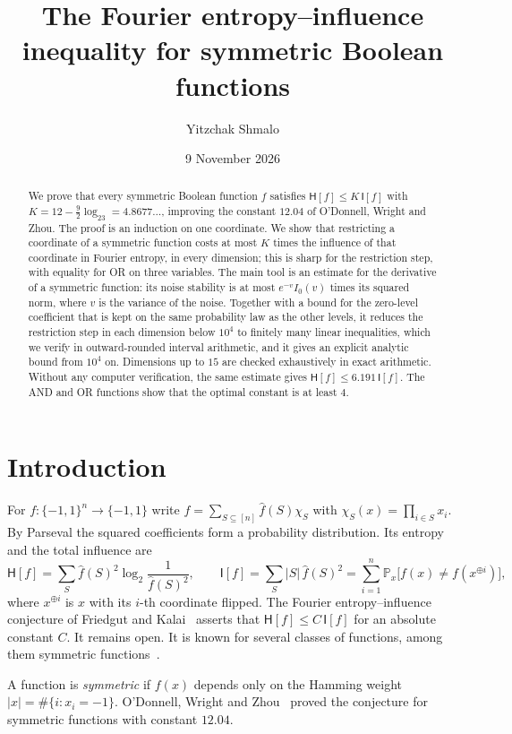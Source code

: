 \documentclass[11pt]{amsart}
\title[Fourier entropy of symmetric functions]{The Fourier entropy--influence inequality for symmetric Boolean functions}
\author{Yitzchak Shmalo}
\date{9 November 2026}
\theoremstyle{definition}
\theoremstyle{remark}
\newcommand{\bits}{\{-1,1\}}
\renewcommand{\P}{\mathbb P}
\newcommand{\HH}{\mathsf H}
\newcommand{\I}{\mathsf I}
\newcommand{\wh}[1]{\widehat{#1}}
\begin{document}
\begin{abstract}
We prove that every symmetric Boolean function $f$ satisfies $\HH[f]\le K\,\I[f]$ with $K=12-\frac92\log_23=4.8677\ldots$, improving the constant $12.04$ of O'Donnell, Wright and Zhou. The proof is an induction on one coordinate. We show that restricting a coordinate of a symmetric function costs at most $K$ times the influence of that coordinate in Fourier entropy, in every dimension; this is sharp for the restriction step, with equality for OR on three variables. The main tool is an estimate for the derivative of a symmetric function: its noise stability is at most $e^{-v}I_0(v)$ times its squared norm, where $v$ is the variance of the noise. Together with a bound for the zero-level coefficient that is kept on the same probability law as the other levels, it reduces the restriction step in each dimension below $10^4$ to finitely many linear inequalities, which we verify in outward-rounded interval arithmetic, and it gives an explicit analytic bound from $10^4$ on. Dimensions up to $15$ are checked exhaustively in exact arithmetic. Without any computer verification, the same estimate gives $\HH[f]\le6.191\,\I[f]$. The AND and OR functions show that the optimal constant is at least $4$.
\end{abstract}
\maketitle

\section{Introduction}

For $f:\bits^n\to\bits$ write $f=\sum_{S\subseteq[n]}\wh f(S)\chi_S$ with $\chi_S(x)=\prod_{i\in S}x_i$. By Parseval the squared coefficients form a probability distribution. Its entropy and the total influence are
\[
 \HH[f]=\sum_{S}\wh f(S)^2\log_2\frac{1}{\wh f(S)^2},\qquad
 \I[f]=\sum_S|S|\,\wh f(S)^2=\sum_{i=1}^n\P_x\bigl[f(x)\ne f(x^{\oplus i})\bigr],
\]
where $x^{\oplus i}$ is $x$ with its $i$-th coordinate flipped. The Fourier entropy--influence conjecture of Friedgut and Kalai~\cite{FK96} asserts that $\HH[f]\le C\,\I[f]$ for an absolute constant $C$. It remains open. It is known for several classes of functions, among them symmetric functions~\cite{OWZ11,KMS12,CKLS16,ACKSW21,Shm26}.

A function is \emph{symmetric} if $f(x)$ depends only on the Hamming weight $|x|=\#\{i:x_i=-1\}$. O'Donnell, Wright and Zhou~\cite{OWZ11} proved the conjecture for symmetric functions with constant $12.04$.
\end{document}

